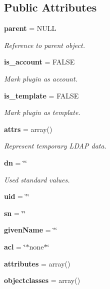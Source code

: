 \subsection*{Public Attributes}
\begin{CompactItemize}
\item 
{\bf parent} = NULL
\begin{CompactList}\small\item\em Reference to parent object. \item\end{CompactList}\item 
{\bf is\_\-account} = FALSE
\begin{CompactList}\small\item\em Mark plugin as account. \item\end{CompactList}\item 
{\bf is\_\-template} = FALSE
\begin{CompactList}\small\item\em Mark plugin as template. \item\end{CompactList}\item 
{\bf attrs} = array()
\begin{CompactList}\small\item\em Represent temporary LDAP data. \item\end{CompactList}\item 
{\bf dn} = \char`\"{}\char`\"{}
\begin{CompactList}\small\item\em Used standard values. \item\end{CompactList}\item 
{\bf uid} = \char`\"{}\char`\"{}\label{classplugin_o5}

\item 
{\bf sn} = \char`\"{}\char`\"{}\label{classplugin_o6}

\item 
{\bf given\-Name} = \char`\"{}\char`\"{}\label{classplugin_o7}

\item 
{\bf acl} = \char`\"{}$\ast$none$\ast$\char`\"{}\label{classplugin_o8}

\item 
{\bf attributes} = array()\label{classplugin_o9}

\item 
{\bf objectclasses} = array()\label{classplugin_o10}

\end{CompactItemize}


